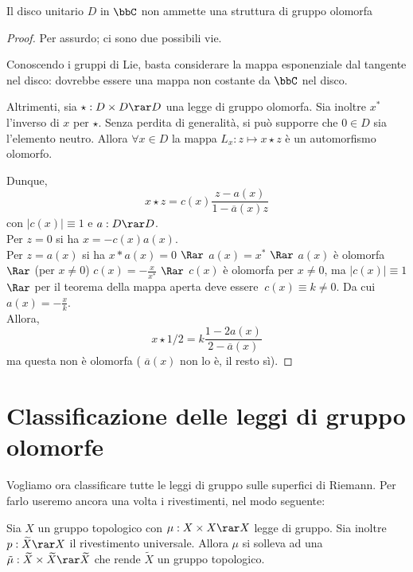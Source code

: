\begin{teorema}
Il disco unitario $D$ in $\bbC$ non ammette una struttura di gruppo olomorfa
\end{teorema}

\begin{proof}
Per assurdo; ci sono due possibili vie.

Conoscendo i gruppi di Lie, basta considerare la mappa esponenziale dal tangente nel disco: dovrebbe essere una mappa non costante da $\bbC$ nel disco. \hfill \Lightning

Altrimenti, sia $\star : D\times D \rar D$ una legge di gruppo olomorfa. Sia inoltre $x^{*}$ l'inverso di $x$ per $\star$. Senza perdita di generalità, si può supporre che $0 \in D$ sia l'elemento neutro.
Allora $\forall x\in D$ la mappa $L_{x}: z\mapsto x\star z$ è un automorfismo olomorfo.

Dunque,  $$x\star z = c(x)\frac{z -a(x)}{1- \overline{a}(x) z}$$
con $|c(x)|\equiv 1$ e $a:D \rar D$.\\
Per $z=0$ si ha $x=-c(x)a(x)$.\\
Per $z=a(x)$ si ha $x*a(x)=0$ $\Rar$ $a(x)=x^{*}$ $\Rar$ $a(x)$ è olomorfa $\Rar$ (per $x\neq 0$) $c(x)=-\frac{x}{x^{*}}$ $\Rar$ $c(x)$ è olomorfa per $x\neq 0$, ma $|c(x)| \equiv 1$ $\Rar$ per il teorema della mappa aperta deve essere $ \ c(x) \equiv k \neq 0$. Da cui $a(x)= -\frac{x}{k}$.\\
Allora, $$x\star 1/2 = k\frac{1-2a(x)}{2-\overline{a}(x)}$$
ma questa non è olomorfa ( $\overline{a}(x)$ non lo è, il resto sì).

\end{proof}

\section{Classificazione delle leggi di gruppo olomorfe}
Vogliamo ora classificare tutte le leggi di gruppo sulle superfici di Riemann. Per farlo useremo ancora una volta i rivestimenti, nel modo seguente:

\begin{lemma}
Sia $X$ un gruppo topologico con $\mu : X\times X \rar X$ legge di gruppo. Sia inoltre $p :\widetilde{X} \rar X$ il rivestimento universale.
Allora $\mu$ si solleva ad una $\tilde{\mu} : \widetilde{X} \times \widetilde{X} \rar \widetilde{X}$ che rende $\widetilde{X}$ un gruppo topologico.
\end{lemma}

